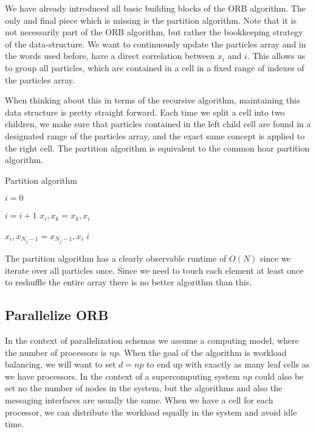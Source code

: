\documentclass[]{article}
\begin{document}
We have already introduced all basic building blocks of the ORB algorithm. The only and final piece which is missing is the partition algorithm. Note that it is not necessarily part of the ORB algorithm, but rather the bookkeeping strategy of the data-structure. We want to continuously update the particles array and in the words used before, have a direct correlation between $x_i$ and $i$. This allows us to group all particles, which are contained in a cell in a fixed range of indexes of the particles array. 

When thinking about this in terms of the recursive algorithm, maintaining this data structure is pretty straight forward. Each time we split a cell into two children, we make sure that particles contained in the left child cell are found in a designated range of the particles array, and the exact same concept is applied to the right cell. The partition algorithm is equivalent to the common hoar partition algorithm. 

\begin{algorithm}[H]
	\caption{Partition algorithm}\label{euclid}
	\begin{algorithmic}[1]
		\State $i = 0$
		
		\State $i = i + 1$
		\State $x_{i}, x_{k} = x_{k}, x_{i}$
		\EndIf
		\EndFor
		
		\State $ x_{i}, x_{N_j-1} = x_{N_j-1}, x_{i}$
		\State \Return $i$
		\EndProcedure
	\end{algorithmic}
\end{algorithm}

The partition algorithm has a clearly observable runtime of $O(N)$ since we iterate over all particles once. Since we need to touch each element at least once to reshuffle the entire array there is no better algorithm than this.


\subsection{Parallelize ORB }

In the context of parallelization schemas we assume a computing model, where the number of processors is $np$. When the goal of the algorithm is workload balancing, we will want to set $d = np$ to end up with exactly as many leaf cells as we have processors. In the context of a supercomputing system $np$ could also be set no the number of nodes in the system, but the algorithms and also the messaging interfaces are usually the same. 
When we have a cell for each processor, we can distribute the workload equally in the system and avoid idle time.
\end{document}
